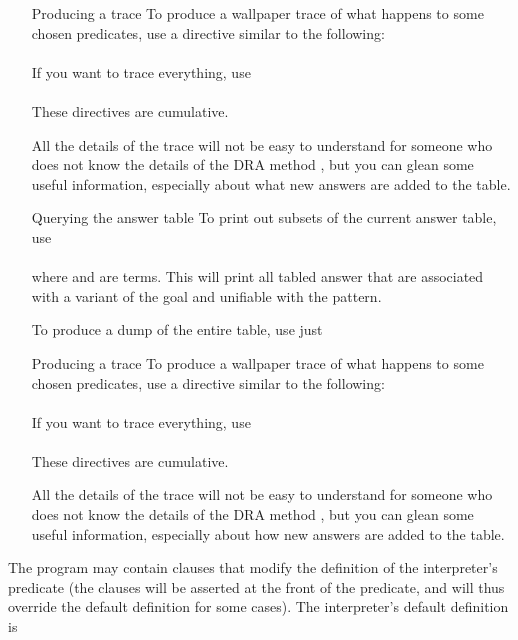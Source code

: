 \begin{itemize}
\item[Producing a trace]
  To produce a wallpaper trace of what happens to some chosen predicates, use
  a directive similar to the following:\\
  \ind{}\\
  If you want to trace everything, use\\
  \ind{}\\
  These directives are cumulative.

  All the details of the trace will not be easy to understand for someone who
  does not know the details of the DRA method \cite{guo-gupta-dra}, but you
  can glean some useful information, especially about what new answers are
  added to the table.

\item[Querying the answer table]
To print out subsets of the current answer table, use\\
\ind{}%
\\
where  and  are terms.
This will print all tabled answer that are associated with a variant of the
goal and unifiable with the pattern.

To produce a dump of the entire table, use just\\
\ind{}

\item[Producing a trace]
  To produce a wallpaper trace of what happens to some chosen predicates, use
  a directive similar to the following:\\
  \ind{}\\
  If you want to trace everything, use\\
  \ind{}\\
  These directives are cumulative.

  All the details of the trace will not be easy to understand for someone who
  does not know the details of the DRA method \cite{guo-gupta-dra}, but you
  can glean some useful information, especially about how new answers are
  added to the table.

\end{itemize}



The program may contain clauses that modify the definition of the
interpreter's predicate  (the clauses will be asserted
at the front of the predicate, and will thus override the default definition
for some cases).  The interpreter's default definition is\\
\ind{}

